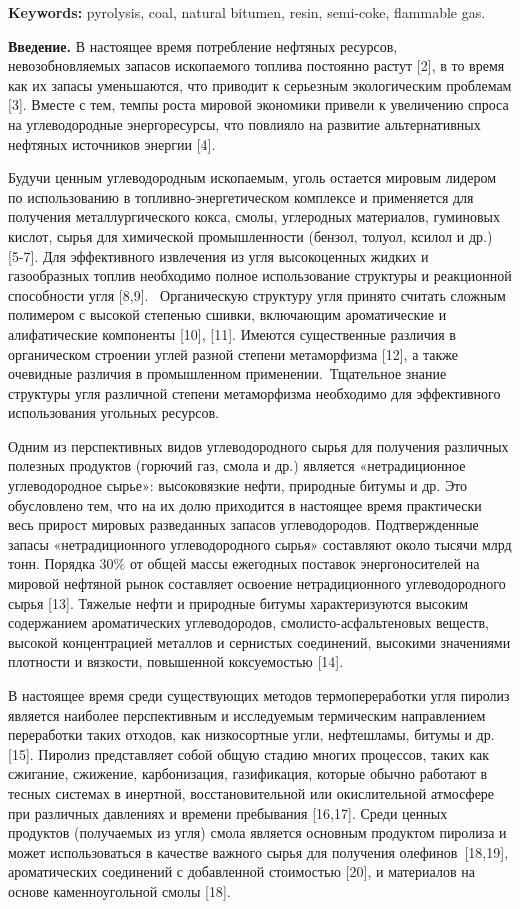 {\bfseries Keywords:} pyrolysis, coal, natural bitumen, resin, semi-coke,
flammable gas.

{\bfseries Введение.} В настоящее время потребление нефтяных ресурсов,
невозобновляемых запасов ископаемого топлива постоянно растут {[}2{]}, в
то время как их запасы уменьшаются, что приводит к серьезным
экологическим проблемам {[}3{]}. Вместе с тем, темпы роста мировой
экономики привели к увеличению спроса на углеводородные энергоре­сурсы,
что повлияло на развитие альтернативных нефтяных источников энергии
{[}4{]}.

Будучи ценным углеводородным ископаемым, уголь остается мировым лидером
по использованию в топливно-энергетическом комплексе и применяется для
получения металлургического кокса, смолы, углеродных материалов,
гуминовых кислот, сырья для химической промышленности (бензол, толуол,
ксилол и др.) {[}5-7{]}. Для эффективного извлечения из угля
высокоценных жидких и газообразных топлив необходимо полное
использование структуры и реакционной способности угля {[}8,9{]}.~
Органическую структуру угля принято считать сложным полимером с высокой
степенью сшивки, включающим ароматические и алифатические компоненты
{[}10{]}, {[}11{]}. Имеются существенные различия в органическом
строении углей разной степени метаморфизма {[}12{]}, а также очевидные
различия в промышленном применении.~Тщательное знание структуры угля
различной степени метаморфизма необходимо для эффективного использования
угольных ресурсов.

Одним из перспективных видов углеводородного сырья для получения
различных полезных продуктов (горючий газ, смола и др.) является
«нетрадиционное углеводородное сырье»: высоковязкие нефти, природные
битумы и др. Это обусловлено тем, что на их долю приходится в настоящее
время практически весь прирост мировых разведанных запасов
углеводородов. Подтвержденные запасы «нетрадиционного углеводородного
сырья» составляют около тысячи млрд тонн. Порядка 30\% от общей массы
ежегодных поставок энергоносителей на мировой нефтяной рынок составляет
освоение нетрадиционного углеводородного сырья {[}13{]}. Тяжелые нефти и
природные битумы характеризуются высоким содержанием ароматиче­ских
углеводородов, смолисто-ас­фальтеновых веществ, высокой кон­центрацией
металлов и сернистых соединений, высокими значениями плотности и
вязкости, повышенной коксуемостью {[}14{]}.

В настоящее время среди существующих методов термопереработки угля
пиролиз является наиболее перспективным и исследуемым термическим
направлением переработки таких отходов, как низкосортные угли,
нефтешламы, битумы и др. {[}15{]}. Пиролиз представляет собой общую
стадию многих процессов, таких как сжигание, сжижение, карбонизация,
газификация, которые обычно работают в тесных системах в инертной,
восстановительной или окислительной атмосфере при различных давлениях и
времени пребывания {[}16,17{]}. Среди ценных продуктов (получаемых из
угля) смола является основным продуктом пиролиза и может использоваться
в качестве важного сырья для получения олефинов~{[}18,19{]},
ароматических соединений с добавленной стоимостью {[}20{]}, и материалов
на основе каменноугольной смолы {[}18{]}.~


